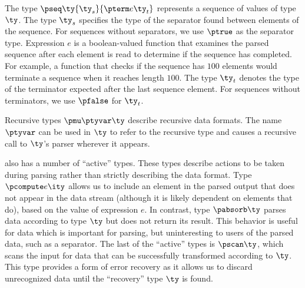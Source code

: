 The type $\pseq \ty {\ty_s} {\pterm e {\ty_t}}$ represents a sequence
of values of type $\ty$. The type $\ty_s$ specifies the type of
the separator found between elements of the sequence. For sequences
without separators, we use $\ptrue$ as the separator type. 
Expression $e$ is a boolean-valued function that examines the parsed
sequence after each element is read to determine
if the sequence has completed. For example, a function that
checks if the sequence has $100$ elements would
terminate a sequence when it reaches length $100$.  The type 
$\ty_t$ denotes the type of the terminator expected after the last sequence
element. For sequences without terminators, we use
$\pfalse$ for $\ty_t$.

Recursive types $\pmu \ptyvar \ty$ describe recursive data formats.
The name $\ptyvar$ can be used in $\ty$ to refer to the recursive type
and causes a recursive call to $\ty$'s parser wherever it appears.

\ddc{} also has a number of ``active'' types.
These types describe actions to be taken during parsing
rather than strictly describing the data format. Type $\pcompute e
\ity$ allows us to include an element in the parsed output that
does not appear in the data stream (although it is likely dependent on
elements that do), based on the value of expression $e$.  In
contrast, type $\pabsorb \ty$ parses data according to type $\ty$
but does not return its result. This behavior is useful for data
which is important for parsing, but
uninteresting to users of the parsed data, such as a separator. The last of the ``active''
types is $\pscan \ty$, which scans the input for 
data that can be successfully transformed according to $\ty$. This type provides a form of error recovery
as it allows us to discard unrecognized data until the ``recovery'' type $\ty$ is found.


